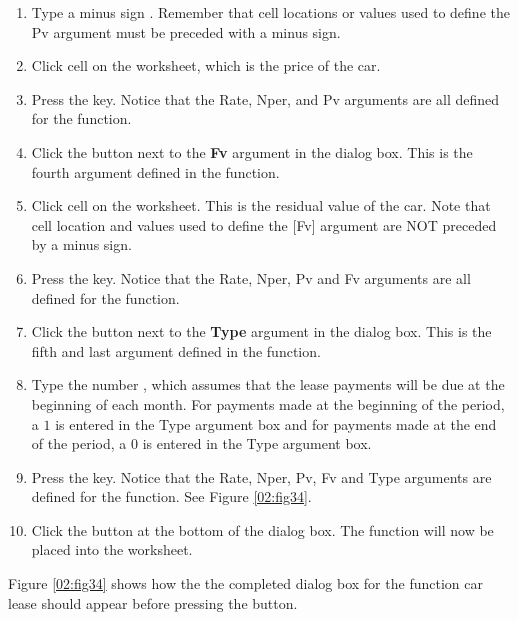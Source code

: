 \begin{enumerate}
	\item Type a minus sign \fmtTyping{-}. Remember that cell locations or values used to define the Pv argument must be preceded with a minus sign.
	\item Click cell  on the worksheet, which is the price of the car.
	\item Press the  key. Notice that the Rate, Nper, and Pv arguments are all defined for the function.
	\item Click the  button next to the \textbf{Fv} argument in the  dialog box. This is the fourth argument defined in the function.
	\item Click cell  on the worksheet. This is the residual value of the car. Note that cell location and values used to define the [Fv] argument are NOT preceded by a minus sign.
	\item Press the  key. Notice that the Rate, Nper, Pv and Fv arguments are all defined for the function.
	\item Click the  button next to the \textbf{Type} argument in the  dialog box. This is the fifth and last argument defined in the function.
	\item Type the number , which assumes that the lease payments will be due at the beginning of each month. For payments made at the beginning of the period, a $ 1 $ is entered in the Type argument box and for payments made at the end of the period, a $ 0 $ is entered in the Type argument box.
	\item Press the  key. Notice that the Rate, Nper, Pv, Fv and Type arguments are defined for the function. See Figure \ref{02:fig34}.
	\item Click the  button at the bottom of the  dialog box. The function will now be placed into the worksheet.
\end{enumerate}

Figure \ref{02:fig34} shows how the the completed  dialog box for the  function car lease should appear before pressing the  button.

